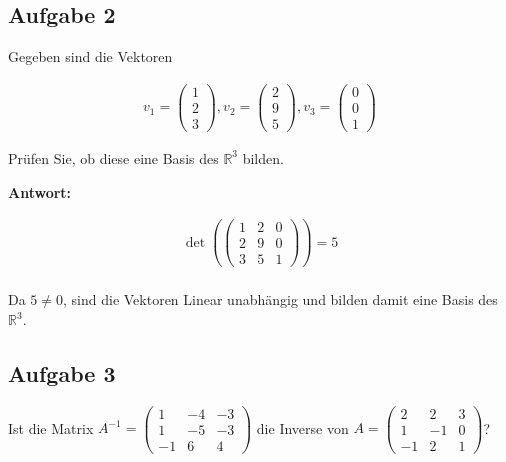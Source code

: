 \subsection{Aufgabe 2}

Gegeben sind die Vektoren

\begin{align*}
    v_1 = \begin{pmatrix}
              1 \\ 2 \\ 3
          \end{pmatrix}, v_2 = \begin{pmatrix}
                                   2 \\ 9 \\ 5
                               \end{pmatrix}, v_3 = \begin{pmatrix}
                                                        0 \\ 0 \\ 1
                                                    \end{pmatrix}
\end{align*}

Prüfen Sie, ob diese eine Basis des $\mathbb{R}^3$ bilden.

\textbf{Antwort:}

\begin{align*}
    \det\left(\begin{pmatrix}
                  1 & 2 & 0 \\
                  2 & 9 & 0 \\
                  3 & 5 & 1
              \end{pmatrix}\right) = 5 \\
\end{align*}

Da $5 \neq 0$, sind die Vektoren Linear unabhängig und bilden damit eine Basis
des $\mathbb{R}^3$.

\subsection{Aufgabe 3}

Ist die Matrix $A^{-1} = \begin{pmatrix}
        1  & -4 & -3 \\
        1  & -5 & -3 \\
        -1 & 6  & 4
    \end{pmatrix}$ die Inverse von $A = \begin{pmatrix}
        2  & 2  & 3 \\
        1  & -1 & 0 \\
        -1 & 2  & 1
    \end{pmatrix}$?

